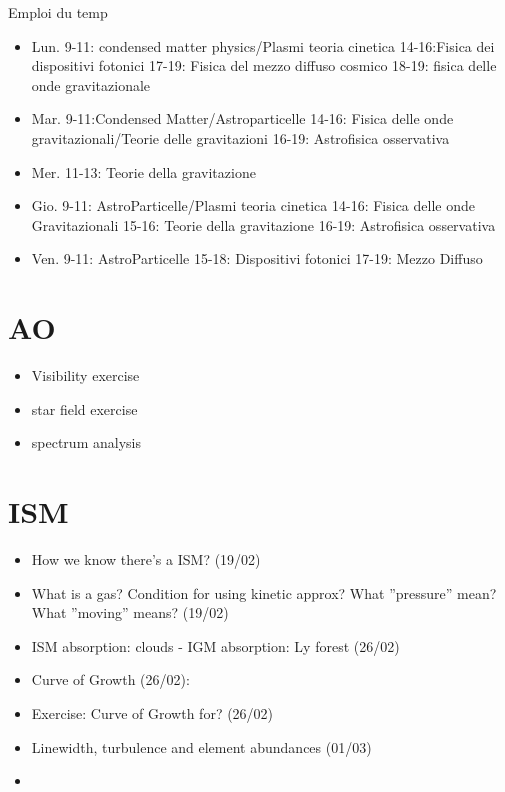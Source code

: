 \documentclass[10pt,xcolor={usenames},fleqn,mathserif,serif]{beamer}
\begin{document}
\begin{frame}[label={why}]{Emploi du temp}
\begin{itemize}
    \item Lun. 9-11: condensed matter physics/Plasmi teoria cinetica 14-16:Fisica dei dispositivi fotonici 17-19: Fisica del mezzo diffuso cosmico 18-19: fisica delle onde gravitazionale
    \item Mar. 9-11:Condensed Matter/Astroparticelle 14-16: Fisica delle onde gravitazionali/Teorie delle gravitazioni 16-19: Astrofisica osservativa
    \item Mer. 11-13: Teorie della gravitazione
    \item Gio. 9-11: AstroParticelle/Plasmi teoria cinetica 14-16: Fisica delle onde Gravitazionali 15-16: Teorie della gravitazione 16-19: Astrofisica osservativa
    \item Ven. 9-11: AstroParticelle 15-18: Dispositivi fotonici 17-19: Mezzo Diffuso
\end{itemize}
\end{frame}

\section{AO}

\begin{itemize}
    \item Visibility exercise
    \item star field exercise
    \item spectrum analysis
\end{itemize}

\section{ISM}

\begin{itemize}
    \item How we know there's a ISM? (19/02)
    \item What is a gas? Condition for using kinetic approx? What ''pressure'' mean? What ''moving'' means? (19/02)
    \item ISM absorption: clouds - IGM absorption: Ly forest (26/02)
    \item Curve of Growth (26/02):
    \item Exercise: Curve of Growth for? (26/02)
    \item Linewidth, turbulence and element abundances (01/03)
    \item 
\end{itemize}
\end{document}
